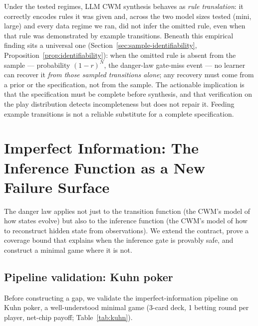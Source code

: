 \documentclass[11pt]{article}
\theoremstyle{remark}
\begin{document}
Under the tested regimes, LLM CWM synthesis behaves as \emph{rule translation}: it correctly encodes rules it was given and, across the two model sizes tested (mini, large) and every data regime we ran, did not infer the omitted rule, even when that rule was demonstrated by example transitions. Beneath this empirical finding sits a universal one (Section~\ref{sec:sample-identifiability}, Proposition~\ref{prop:identifiability}): when the omitted rule is absent from the sample --- probability $(1-r)^N$, the danger-law gate-miss event --- no learner can recover it \emph{from those sampled transitions alone}; any recovery must come from a prior or the specification, not from the sample. The actionable implication is that the specification must be complete before synthesis, and that verification on the play distribution detects incompleteness but does not repair it. Feeding example transitions is not a reliable substitute for a complete specification.

\section{Imperfect Information: The Inference Function as a New Failure Surface}
\label{sec:imperfect}

The danger law applies not just to the transition function (the CWM's model of how states evolve) but also to the inference function (the CWM's model of how to reconstruct hidden state from observations). We extend the contract, prove a coverage bound that explains when the inference gate is provably safe, and construct a minimal game where it is not.

\subsection{Pipeline validation: Kuhn poker}
\label{sec:kuhn-validation}

Before constructing a gap, we validate the imperfect-information pipeline on Kuhn poker, a well-understood minimal game (3-card deck, 1 betting round per player, net-chip payoff; Table~\ref{tab:kuhn}).

\begin{table}[ht]
\centering
\small
{}
\caption{Kuhn poker pipeline validation.}
\label{tab:kuhn}
\end{table}
\end{document}
